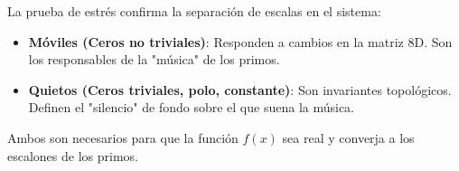 \documentclass[12pt,a4paper]{article}
\begin{document}
La prueba de estrés confirma la separación de escalas en el sistema:

\begin{itemize}
\item \textbf{Móviles (Ceros no triviales)}: Responden a cambios en la matriz 8D. Son los responsables de la "música" de los primos.
\item \textbf{Quietos (Ceros triviales, polo, constante)}: Son invariantes topológicos. Definen el "silencio" de fondo sobre el que suena la música.
\end{itemize}

Ambos son necesarios para que la función \(f(x)\) sea real y converja a los escalones de los primos.
\end{document}
